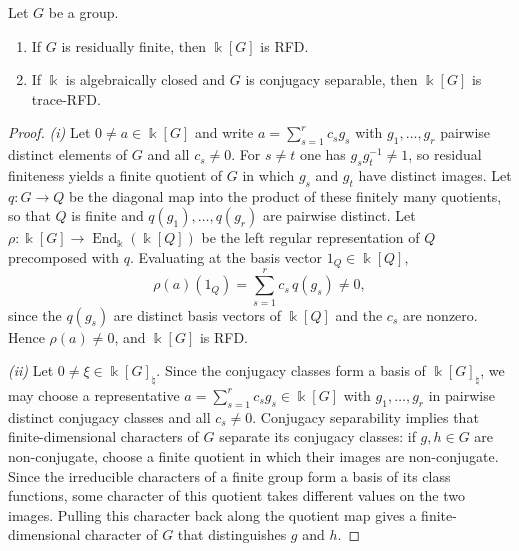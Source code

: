 \begin{proposition}\label{prop_group_algebra}
    Let \(G\) be a group.
    \begin{enumerate}[label=\textup{(\roman*)},leftmargin=5ex]
        \item If \(G\) is residually finite, then \(\Bbbk[G]\) is RFD.
        \item If \(\Bbbk\) is algebraically closed and \(G\) is conjugacy separable, then \(\Bbbk[G]\) is trace-RFD.
    \end{enumerate}
\end{proposition}
\begin{proof}
    \emph{(i)} Let \(0\neq a\in\Bbbk[G]\) and write \(a=\sum_{s=1}^{r}c_s g_s\) with \(g_1,\ldots,g_r\) pairwise distinct elements of \(G\) and all \(c_s\neq0\). For \(s\neq t\) one has \(g_s g_t^{-1}\neq1\), so residual finiteness yields a finite quotient of \(G\) in which \(g_s\) and \(g_t\) have distinct images. Let \(q\colon G\to Q\) be the diagonal map into the product of these finitely many quotients, so that \(Q\) is finite and \(q(g_1),\ldots,q(g_r)\) are pairwise distinct. Let \(\rho\colon\Bbbk[G]\to\operatorname{End}_{\Bbbk}(\Bbbk[Q])\) be the left regular representation of \(Q\) precomposed with \(q\). Evaluating at the basis vector \(1_Q\in\Bbbk[Q]\),
    \[
        \rho(a)(1_Q)=\sum_{s=1}^{r}c_s\,q(g_s)\neq0,
    \]
    since the \(q(g_s)\) are distinct basis vectors of \(\Bbbk[Q]\) and the \(c_s\) are nonzero. Hence \(\rho(a)\neq0\), and \(\Bbbk[G]\) is RFD.

    \emph{(ii)} Let \(0\neq\xi\in\Bbbk[G]_{\natural}\). Since the conjugacy classes form a basis of \(\Bbbk[G]_{\natural}\), we may choose a representative \(a=\sum_{s=1}^{r}c_s g_s\in\Bbbk[G]\) with \(g_1,\ldots,g_r\) in pairwise distinct conjugacy classes and all \(c_s\neq0\). Conjugacy separability implies that finite-dimensional characters of \(G\) separate its conjugacy classes: if \(g,h\in G\) are non-conjugate, choose a finite quotient in which their images are non-conjugate. Since the irreducible characters of a finite group form a basis of its class functions, some character of this quotient takes different values on the two images. Pulling this character back along the quotient map gives a finite-dimensional character of \(G\) that distinguishes \(g\) and \(h\).


\end{proof}
